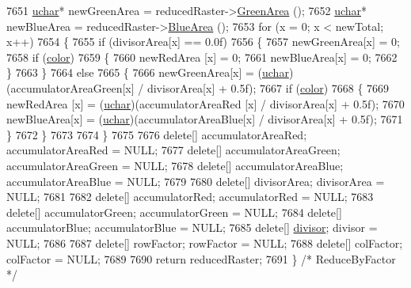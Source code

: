 \begin{DoxyCode}
7651   \hyperlink{namespace_k_k_b_ace9969169bf514f9ee6185186949cdf7}{uchar}*  newGreenArea = reducedRaster->\hyperlink{class_k_k_b_1_1_raster_af6ceacfa7835a295d239d141627dbec7}{GreenArea} ();
7652   \hyperlink{namespace_k_k_b_ace9969169bf514f9ee6185186949cdf7}{uchar}*  newBlueArea  = reducedRaster->\hyperlink{class_k_k_b_1_1_raster_ade7c77867e6b3833e96f5f86aefcffec}{BlueArea}  ();
7653   \textcolor{keywordflow}{for}  (x = 0;  x < newTotal;  x++)
7654   \{
7655     \textcolor{keywordflow}{if}  (divisorArea[x] == 0.0f)
7656     \{
7657       newGreenArea[x] = 0;
7658       \textcolor{keywordflow}{if}  (\hyperlink{class_k_k_b_1_1_raster_a482384d89cc53fa4f36276307c746854}{color})
7659       \{
7660         newRedArea [x] = 0;
7661         newBlueArea[x] = 0;
7662       \}
7663     \}
7664     \textcolor{keywordflow}{else}
7665     \{
7666       newGreenArea[x] = (\hyperlink{namespace_k_k_b_ace9969169bf514f9ee6185186949cdf7}{uchar})(accumulatorAreaGreen[x] / divisorArea[x] + 0.5f);
7667       \textcolor{keywordflow}{if}  (\hyperlink{class_k_k_b_1_1_raster_a482384d89cc53fa4f36276307c746854}{color})
7668       \{
7669         newRedArea [x] = (\hyperlink{namespace_k_k_b_ace9969169bf514f9ee6185186949cdf7}{uchar})(accumulatorAreaRed [x] / divisorArea[x] + 0.5f);
7670         newBlueArea[x] = (\hyperlink{namespace_k_k_b_ace9969169bf514f9ee6185186949cdf7}{uchar})(accumulatorAreaBlue[x] / divisorArea[x] + 0.5f);
7671       \}
7672     \}
7673      
7674   \}
7675 
7676   \textcolor{keyword}{delete}[]  accumulatorAreaRed;    accumulatorAreaRed   = NULL;
7677   \textcolor{keyword}{delete}[]  accumulatorAreaGreen;  accumulatorAreaGreen = NULL;
7678   \textcolor{keyword}{delete}[]  accumulatorAreaBlue;   accumulatorAreaBlue  = NULL;
7679 
7680   \textcolor{keyword}{delete}[]  divisorArea;       divisorArea    = NULL;
7681 
7682   \textcolor{keyword}{delete}[]  accumulatorRed;    accumulatorRed    = NULL;
7683   \textcolor{keyword}{delete}[]  accumulatorGreen;  accumulatorGreen  = NULL;
7684   \textcolor{keyword}{delete}[]  accumulatorBlue;   accumulatorBlue   = NULL;
7685   \textcolor{keyword}{delete}[]  \hyperlink{class_k_k_b_1_1_raster_afaaaf54fd824a4a47fba97f7fba9398f}{divisor};           divisor           = NULL;
7686 
7687   \textcolor{keyword}{delete}[]  rowFactor;       rowFactor      = NULL;
7688   \textcolor{keyword}{delete}[]  colFactor;       colFactor      = NULL;
7689 
7690   \textcolor{keywordflow}{return}  reducedRaster;
7691 \}  \textcolor{comment}{/* ReduceByFactor */}
\end{DoxyCode}
